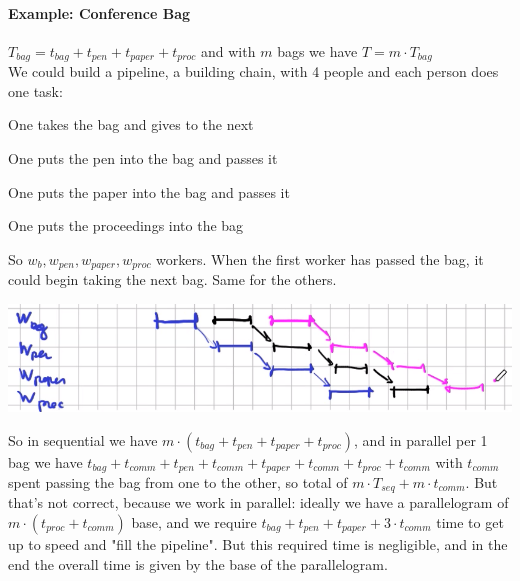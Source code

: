 \documentclass[10pt]{report}
\begin{document}
\paragraph{Example: Conference Bag} $T_{bag} = t_{bag} + t_{pen} + t_{paper} + t_{proc}$ and with $m$ bags we have $T = m\cdot T_{bag}$\\
We could build a pipeline, a building chain, with 4 people and each person does one task: \begin{list}{}{}
	\item One takes the bag and gives to the next
	\item One puts the pen into the bag and passes it
	\item One puts the paper into the bag and passes it
	\item One puts the proceedings into the bag
\end{list}
So $w_b, w_{pen}, w_{paper}, w_{proc}$ workers. When the first worker has passed the bag, it could begin taking the next bag. Same for the others.
\begin{center}
	\includegraphics[scale=0.5]{1.png}
\end{center}
So in sequential we have $m\cdot(t_{bag} + t_{pen} + t_{paper} + t_{proc})$, and in parallel per 1 bag we have $t_{bag} + t_{comm} + t_{pen} + t_{comm} + t_{paper} + t_{comm} + t_{proc} + t_{comm}$ with $t_{comm}$ spent passing the bag from one to the other, so total of $m\cdot T_{seq} + m\cdot t_{comm}$. But that's not correct, because we work in parallel: ideally we have a parallelogram of $m\cdot(t_{proc} + t_{comm})$ base, and we require $t_{bag} + t_{pen} + t_{paper} + 3\cdot t_{comm}$ time to get up to speed and "fill the pipeline". But this required time is negligible, and in the end the overall time is given by the base of the parallelogram.
\end{document}
